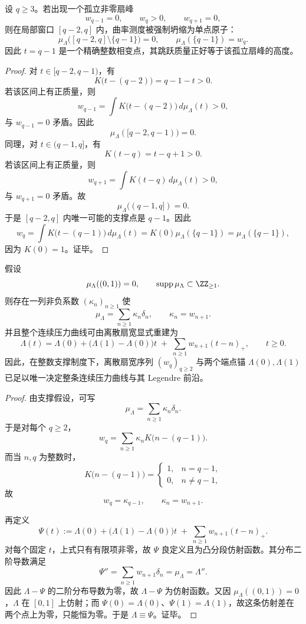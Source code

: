 \begin{theorem}[孤立扇峰的整数刚性]\label{thm:conclusion-isolated-fan-peak-integer-rigidity}
设 \(q\ge 3\)。若出现一个孤立非零扇峰
\[
w_{q-1}=0,\qquad
w_q>0,\qquad
w_{q+1}=0,
\]
则在局部窗口 \([q-2,q]\) 内，曲率测度被强制坍缩为单点原子：
\[
\mu_\Lambda\bigl([q-2,q]\setminus\{q-1\}\bigr)=0,
\qquad
\mu_\Lambda(\{q-1\})=w_q.
\]
因此 \(t=q-1\) 是一个精确整数相变点，其跳跃质量正好等于该孤立扇峰的高度。
\end{theorem}
\begin{proof}
对 \(t\in[q-2,q-1)\)，有
\[
K\bigl(t-(q-2)\bigr)=q-1-t>0.
\]
若该区间上有正质量，则
\[
w_{q-1}=\int K\bigl(t-(q-2)\bigr)\,d\mu_\Lambda(t)>0,
\]
与 \(w_{q-1}=0\) 矛盾。因此
\[
\mu_\Lambda([q-2,q-1))=0.
\]
同理，对 \(t\in(q-1,q]\)，有
\[
K(t-q)=t-q+1>0.
\]
若该区间上有正质量，则
\[
w_{q+1}=\int K(t-q)\,d\mu_\Lambda(t)>0,
\]
与 \(w_{q+1}=0\) 矛盾。故
\[
\mu_\Lambda((q-1,q])=0.
\]
于是 \([q-2,q]\) 内唯一可能的支撑点是 \(q-1\)。因此
\[
w_q=\int K\bigl(t-(q-1)\bigr)\,d\mu_\Lambda(t)=K(0)\mu_\Lambda(\{q-1\})=\mu_\Lambda(\{q-1\}),
\]
因为 \(K(0)=1\)。证毕。
\end{proof}

\begin{theorem}[整数支撑曲率的精确样条重建]\label{thm:conclusion-integer-supported-curvature-exact-spline-reconstruction}
假设
\[
\mu_\Lambda((0,1))=0,
\qquad
\operatorname{supp}\mu_\Lambda\subset \ZZ_{\ge 1}.
\]
则存在一列非负系数 \((\kappa_n)_{n\ge 1}\) 使
\[
\mu_\Lambda=\sum_{n\ge 1}\kappa_n\delta_n,
\qquad
\kappa_n=w_{n+1}.
\]
并且整个连续压力曲线可由离散扇宽显式重建为
\[
\Lambda(t)
=
\Lambda(0)+\bigl(\Lambda(1)-\Lambda(0)\bigr)t
\;+\;
\sum_{n\ge 1}w_{n+1}(t-n)_+,
\qquad
t\ge 0.
\]
因此，在整数支撑制度下，离散扇宽序列 \((w_q)_{q\ge 2}\) 与两个端点锚 \(\Lambda(0),\Lambda(1)\) 已足以唯一决定整条连续压力曲线与其 Legendre 前沿。
\end{theorem}
\begin{proof}
由支撑假设，可写
\[
\mu_\Lambda=\sum_{n\ge 1}\kappa_n\delta_n.
\]
于是对每个 \(q\ge 2\)，
\[
w_q
=
\sum_{n\ge 1}\kappa_n K\bigl(n-(q-1)\bigr).
\]
而当 \(n,q\) 为整数时，
\[
K\bigl(n-(q-1)\bigr)=
\begin{cases}
1,& n=q-1,\\
0,& n\neq q-1,
\end{cases}
\]
故
\[
w_q=\kappa_{q-1},
\qquad
\kappa_n=w_{n+1}.
\]

再定义
\[
\Psi(t):=
\Lambda(0)+\bigl(\Lambda(1)-\Lambda(0)\bigr)t
\;+\;
\sum_{n\ge 1}w_{n+1}(t-n)_+.
\]
对每个固定 \(t\)，上式只有有限项非零，故 \(\Psi\) 良定义且为凸分段仿射函数。其分布二阶导数满足
\[
\Psi''=\sum_{n\ge 1}w_{n+1}\delta_n=\mu_\Lambda=\Lambda''.
\]
因此 \(\Lambda-\Psi\) 的二阶分布导数为零，故 \(\Lambda-\Psi\) 为仿射函数。又因 \(\mu_\Lambda((0,1))=0\)，\(\Lambda\) 在 \([0,1]\) 上仿射；而 \(\Psi(0)=\Lambda(0)\)、\(\Psi(1)=\Lambda(1)\)，故这条仿射差在两个点上为零，只能恒为零。于是 \(\Lambda\equiv\Psi\)。证毕。
\end{proof}

